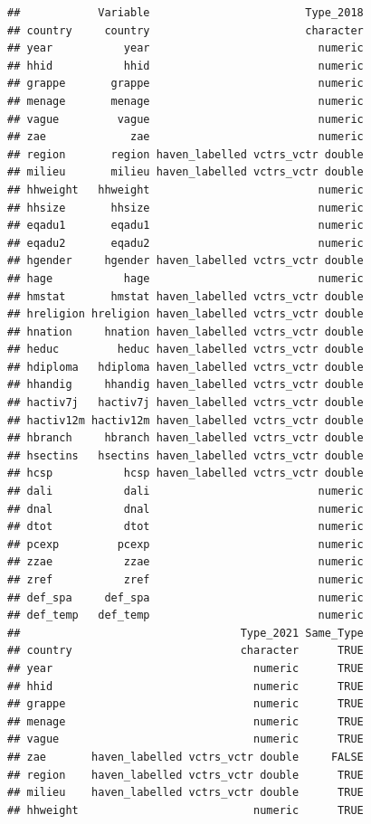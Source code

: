 \documentclass[
]{article}
\begin{document}
\begin{verbatim}
##            Variable                        Type_2018
## country     country                        character
## year           year                          numeric
## hhid           hhid                          numeric
## grappe       grappe                          numeric
## menage       menage                          numeric
## vague         vague                          numeric
## zae             zae                          numeric
## region       region haven_labelled vctrs_vctr double
## milieu       milieu haven_labelled vctrs_vctr double
## hhweight   hhweight                          numeric
## hhsize       hhsize                          numeric
## eqadu1       eqadu1                          numeric
## eqadu2       eqadu2                          numeric
## hgender     hgender haven_labelled vctrs_vctr double
## hage           hage                          numeric
## hmstat       hmstat haven_labelled vctrs_vctr double
## hreligion hreligion haven_labelled vctrs_vctr double
## hnation     hnation haven_labelled vctrs_vctr double
## heduc         heduc haven_labelled vctrs_vctr double
## hdiploma   hdiploma haven_labelled vctrs_vctr double
## hhandig     hhandig haven_labelled vctrs_vctr double
## hactiv7j   hactiv7j haven_labelled vctrs_vctr double
## hactiv12m hactiv12m haven_labelled vctrs_vctr double
## hbranch     hbranch haven_labelled vctrs_vctr double
## hsectins   hsectins haven_labelled vctrs_vctr double
## hcsp           hcsp haven_labelled vctrs_vctr double
## dali           dali                          numeric
## dnal           dnal                          numeric
## dtot           dtot                          numeric
## pcexp         pcexp                          numeric
## zzae           zzae                          numeric
## zref           zref                          numeric
## def_spa     def_spa                          numeric
## def_temp   def_temp                          numeric
##                                  Type_2021 Same_Type
## country                          character      TRUE
## year                               numeric      TRUE
## hhid                               numeric      TRUE
## grappe                             numeric      TRUE
## menage                             numeric      TRUE
## vague                              numeric      TRUE
## zae       haven_labelled vctrs_vctr double     FALSE
## region    haven_labelled vctrs_vctr double      TRUE
## milieu    haven_labelled vctrs_vctr double      TRUE
## hhweight                           numeric      TRUE

\end{verbatim}
\end{document}
